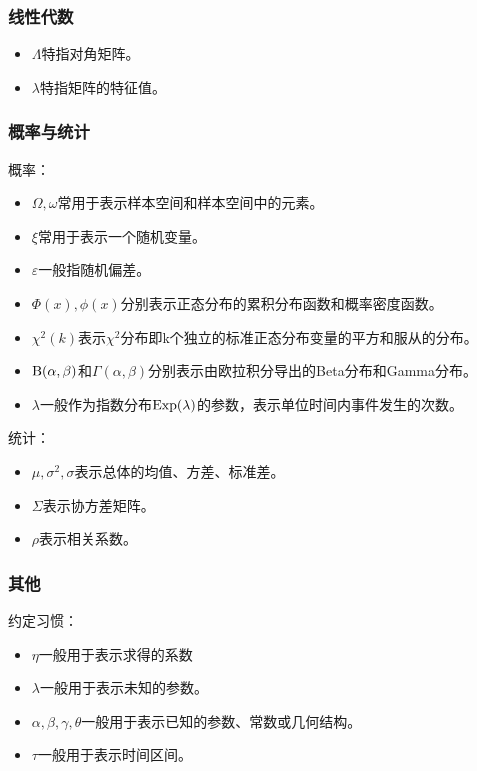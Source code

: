\subsubsection{线性代数}

\begin{itemize}
\item $\Lambda$特指对角矩阵。
\item $\lambda$特指矩阵的特征值。
\end{itemize}

\subsubsection{概率与统计}

概率：
\begin{itemize}
\item $\Omega,\omega$常用于表示样本空间和样本空间中的元素。
\item $\xi$常用于表示一个随机变量。
\item $\varepsilon$一般指随机偏差。
\item $\Phi(x),\phi(x)$分别表示正态分布的累积分布函数和概率密度函数。
\item $\chi^2(k)$表示$\chi^2$分布即k个独立的标准正态分布变量的平方和服从的分布。
\item ${\rm B(\alpha,\beta)}$和$\Gamma (\alpha,\beta)$分别表示由欧拉积分导出的Beta分布和Gamma分布。
\item $\lambda$一般作为指数分布${\rm Exp}(\lambda)$的参数，表示单位时间内事件发生的次数。
\end{itemize}

统计：
\begin{itemize}
\item $\mu,\sigma^2,\sigma$表示总体的均值、方差、标准差。
\item $\Sigma$表示协方差矩阵。
\item $\rho$表示相关系数。
\end{itemize}


\subsubsection{其他}

约定习惯：

\begin{itemize}
\item $\eta$一般用于表示求得的系数
\item $\lambda$一般用于表示未知的参数。
\item $\alpha,\beta,\gamma,\theta$一般用于表示已知的参数、常数或几何结构。
\item $\tau$一般用于表示时间区间。
\end{itemize}

